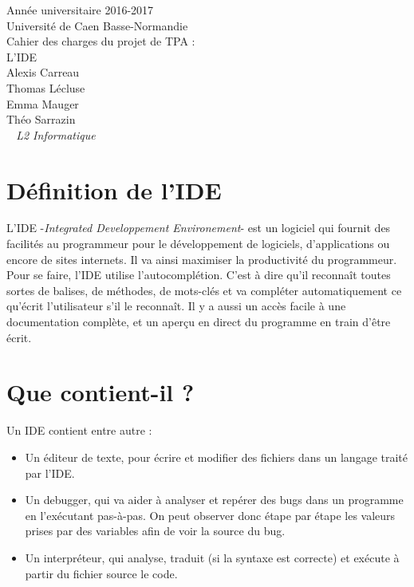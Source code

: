 \documentclass[a4paper,12pt]{article} %
\begin{document}

\begin{titlepage}
	\begin{center}
		\Large{Année universitaire 2016-2017}\\
		\Large{Université de Caen Basse-Normandie}\\[1cm]
		
		\huge{Cahier des charges du projet de TPA :}\\
		L'IDE\\
		\vspace{3cm}
		Alexis Carreau\\
		Thomas Lécluse\\
		Emma Mauger\\
		Théo Sarrazin\\
	\normalsize{\textit{ ~ L2 Informatique}}\\
		\medskip
		\vspace{2cm}
		
	\end{center}
\end{titlepage}

\tableofcontents
\newpage

\section{Définition de l'IDE}
	L'IDE -\normalsize{\textit{Integrated Developpement Environement}}- est un logiciel qui fournit des facilités au programmeur pour le développement de logiciels, d'applications ou encore de sites internets. Il va ainsi maximiser la productivité du programmeur.\\ 	
	Pour se faire, l'IDE utilise l'autocomplétion. C'est à dire qu'il reconnaît toutes sortes de balises, de méthodes, de mots-clés et va compléter automatiquement ce qu'écrit l'utilisateur s'il le reconnaît. Il y a aussi un accès facile à une documentation complète, et un aperçu en direct du programme en train d'être écrit.
	
\section{Que contient-il ?}
	Un IDE contient entre autre :
	\begin{itemize}
		\item Un éditeur de texte, pour écrire et modifier des fichiers dans un langage traité par l'IDE.
		\item Un debugger, qui va aider à analyser et repérer des bugs dans un programme en l'exécutant pas-à-pas. On peut observer donc étape par étape les valeurs prises par des variables afin de voir la source du bug.
		\item Un interpréteur, qui analyse, traduit (si la syntaxe est correcte) et exécute à partir du fichier source le code.
	\end{itemize}
	
\end{document}
